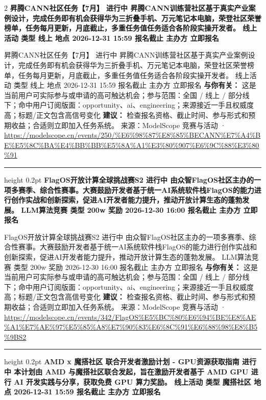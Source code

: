\documentclass[10.5pt]{ctexart}
\begin{document}
\begin{multicols}{2}
{\large\bfseries 昇腾CANN社区任务【7月】 进行中 昇腾CANN训练营社区基于真实产业案例设计，完成任务即有机会获得华为三折叠手机、万元笔记本电脑，荣登社区荣誉榜单，任务每月更新，月底截止，多重任务值任务适合各阶段实操开发者。 线上活动 类型 线上 地点 2026-12-31 15:59 报名截止 主办方 立即报名}\par
昇腾CANN社区任务【7月】 进行中 昇腾CANN训练营社区基于真实产业案例设计，完成任务即有机会获得华为三折叠手机、万元笔记本电脑，荣登社区荣誉榜单，任务每月更新，月底截止，多重任务值任务适合各阶段实操开发者。 线上活动 类型 线上 地点 2026-12-31 15:59 报名截止 主办方 立即报名
\textbf{与你有关：} 这是当前用户可实际参与或申请的高可触达机会；参与范围：全国 / 线上 / 部分线下；命中用户订阅版面：opportunity、ai、engineering；来源接近一手且权威度高；标题/正文包含高信号变化
\textbf{建议：} 检查报名资格、截止时间、参与形式和预期收益；合适则立即加入任务系统。
{\footnotesize\color{ormuted} 来源：ModelScope 竞赛与活动 · \url{https://modelscope.cn/events/250/%E6%98%87%E8%85%BECANN%E7%A4%BE%E5%8C%BA%E4%BB%BB%E5%8A%A1%E3%80%907%E6%9C%88%E3%80%91}}
\vspace{2mm}
\hrule height 0.2pt
\vspace{2mm}
{\large\bfseries FlagOS开放计算全球挑战赛S2 进行中 由众智FlagOS社区主办的一项多赛季、综合性赛事。大赛鼓励开发者基于统一AI系统软件栈FlagOS的能力进行创作实战和创新探索，促进AI开发者能力提升，推动开放计算生态的蓬勃发展。 LLM算法竞赛 类型 200w 奖励 2026-12-30 16:00 报名截止 主办方 立即报名}\par
FlagOS开放计算全球挑战赛S2 进行中 由众智FlagOS社区主办的一项多赛季、综合性赛事。大赛鼓励开发者基于统一AI系统软件栈FlagOS的能力进行创作实战和创新探索，促进AI开发者能力提升，推动开放计算生态的蓬勃发展。 LLM算法竞赛 类型 200w 奖励 2026-12-30 16:00 报名截止 主办方 立即报名
\textbf{与你有关：} 这是当前用户可实际参与或申请的高可触达机会；参与范围：全国 / 线上 / 部分线下；命中用户订阅版面：opportunity、ai、engineering；来源接近一手且权威度高；标题/正文包含高信号变化
\textbf{建议：} 检查报名资格、截止时间、参与形式和预期收益；合适则立即加入任务系统。
{\footnotesize\color{ormuted} 来源：ModelScope 竞赛与活动 · \url{https://modelscope.cn/events/342/FlagOS%E5%BC%80%E6%94%BE%E8%AE%A1%E7%AE%97%E5%85%A8%E7%90%83%E6%8C%91%E6%88%98%E8%B5%9BS2}}
\vspace{2mm}
\hrule height 0.2pt
\vspace{2mm}
{\large\bfseries AMD x 魔搭社区 联合开发者激励计划 - GPU资源获取指南 进行中 本计划由 AMD 与魔搭社区联合发起，旨在激励开发者基于 AMD GPU 进行 AI 开发实践与分享，获取免费 GPU 算力奖励。 线上活动 类型 魔搭社区 地点 2026-12-31 15:59 报名截止 主办方 立即报名}\par

\end{multicols}
\end{document}

